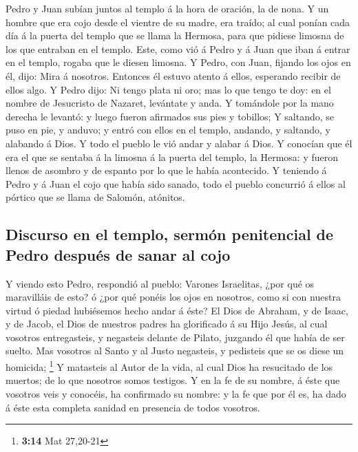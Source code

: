  Pedro y Juan subían juntos al templo á la hora de
oración, la de nona.  Y un hombre que era cojo desde el
vientre de su madre, era traído; al cual ponían cada día á la puerta del
templo que se llama la Hermosa, para que pidiese limosna de los que
entraban en el templo.  Este, como vió á Pedro y á Juan
que iban á entrar en el templo, rogaba que le diesen limosna.
 Y Pedro, con Juan, fijando los ojos en él, dijo: Mira á
nosotros.  Entonces él estuvo atento á ellos, esperando
recibir de ellos algo.  Y Pedro dijo: Ni tengo plata ni
oro; mas lo que tengo te doy: en el nombre de Jesucristo de Nazaret,
levántate y anda.  Y tomándole por la mano derecha le
levantó: y luego fueron afirmados sus pies y tobillos;  Y
saltando, se puso en pie, y anduvo; y entró con ellos en el templo,
andando, y saltando, y alabando á Dios.  Y todo el pueblo
le vió andar y alabar á Dios.  Y conocían que él era el
que se sentaba á la limosna á la puerta del templo, la Hermosa: y fueron
llenos de asombro y de espanto por lo que le había acontecido.
 Y teniendo á Pedro y á Juan el cojo que había sido
sanado, todo el pueblo concurrió á ellos al pórtico que se llama de
Salomón, atónitos.

\hypertarget{discurso-en-el-templo-sermuxf3n-penitencial-de-pedro-despuuxe9s-de-sanar-al-cojo}{%
\subsection{Discurso en el templo, sermón penitencial de Pedro después
de sanar al
cojo}\label{discurso-en-el-templo-sermuxf3n-penitencial-de-pedro-despuuxe9s-de-sanar-al-cojo}}

 Y viendo esto Pedro, respondió al pueblo: Varones
Israelitas, ¿por qué os maravilláis de esto? ó ¿por qué ponéis los ojos
en nosotros, como si con nuestra virtud ó piedad hubiésemos hecho andar
á éste?  El Dios de Abraham, y de Isaac, y de Jacob, el
Dios de nuestros padres ha glorificado á su Hijo Jesús, al cual vosotros
entregasteis, y negasteis delante de Pilato, juzgando él que había de
ser suelto.  Mas vosotros al Santo y al Justo negasteis,
y pedisteis que se os diese un homicida; \footnote{\textbf{3:14} Mat
  27,20-21}  Y matasteis al Autor de la vida, al cual
Dios ha resucitado de los muertos; de lo que nosotros somos testigos.
 Y en la fe de su nombre, á éste que vosotros veis y
conocéis, ha confirmado su nombre: y la fe que por él es, ha dado á éste
esta completa sanidad en presencia de todos vosotros.

